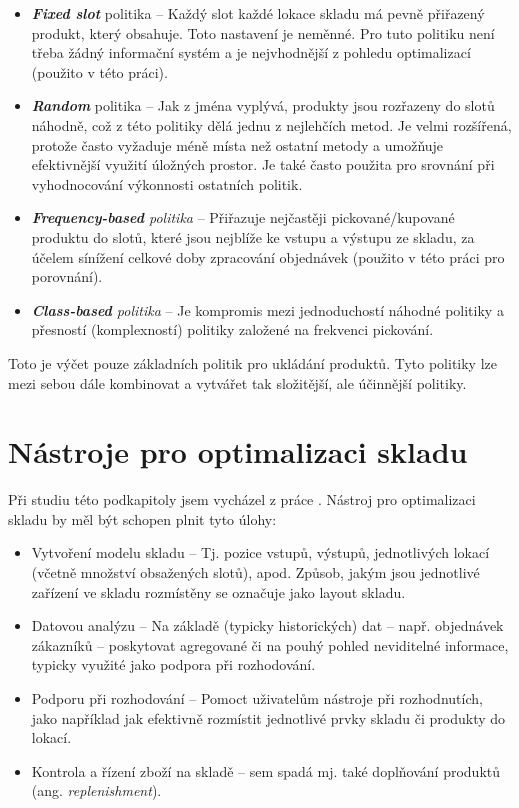 \begin{itemize}
    \item \emph{\textbf{Fixed slot}} politika -- Každý slot každé lokace skladu má pevně přiřazený produkt, který obsahuje. Toto nastavení je neměnné. Pro tuto politiku není třeba žádný informační systém a je nejvhodnější z pohledu optimalizací (použito v této práci).
    \item \emph{\textbf{Random}} politika -- Jak z jména vyplývá, produkty jsou rozřazeny do slotů náhodně, což z této politiky dělá jednu z nejlehčích metod. Je velmi rozšířená, protože často vyžaduje méně místa než ostatní metody a umožňuje efektivnější využití úložných prostor. Je také často použita pro srovnání při vyhodnocování výkonnosti ostatních politik.
    \item \emph{\textbf{Frequency-based} politika} -- Přiřazuje nejčastěji pickované/kupované produktu do slotů, které jsou nejblíže ke vstupu a výstupu ze skladu, za účelem sínížení celkové doby zpracování objednávek (použito v této práci pro porovnání).
    \item \emph{\textbf{Class-based} politika} -- Je kompromis mezi jednoduchostí náhodné politiky a přesností (komplexností) politiky založené na frekvenci pickování.
\end{itemize}

Toto je výčet pouze základních politik pro ukládání produktů. Tyto politiky lze mezi sebou dále kombinovat a vytvářet tak složitější, ale účinnější politiky.


\section{Nástroje pro optimalizaci skladu}
Při studiu této podkapitoly jsem vycházel z práce \cite{slapSeacomp}. Nástroj pro optimalizaci skladu by měl být schopen plnit tyto úlohy:

\begin{itemize}
    \item Vytvoření modelu skladu -- Tj. pozice vstupů, výstupů, jednotlivých lokací (včetně množství obsažených slotů), apod. Způsob, jakým jsou jednotlivé zařízení ve skladu rozmístěny se označuje jako layout skladu.
    \item Datovou analýzu -- Na základě (typicky historických) dat -- např. objednávek zákazníků -- poskytovat agregované či na pouhý pohled neviditelné informace, typicky využité jako podpora při rozhodování.
    \item Podporu při rozhodování -- Pomoct uživatelům nástroje při rozhodnutích, jako například jak efektivně rozmístit jednotlivé prvky skladu či produkty do lokací.
    \item Kontrola a řízení zboží na skladě -- sem spadá mj. také doplňování produktů (ang. \emph{replenishment}).
\end{itemize}

